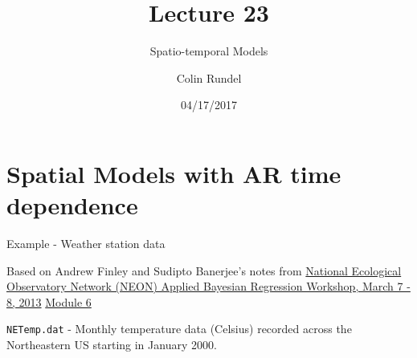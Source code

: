 \documentclass[11pt,ignorenonframetext,]{beamer}
\title{Lecture 23}
\subtitle{Spatio-temporal Models}
\author{Colin Rundel}
\date{04/17/2017}
\let\oldShaded\Shaded
\let\endoldShaded\endShaded
\let\oldverbatim\verbatim
\let\endoldverbatim\endverbatim
\newcommand{\scriptoutput}{
  \renewenvironment{Shaded}{\scriptsize\begin{spacing}{0.9}\oldShaded}{\endoldShaded\end{spacing}}
  \renewenvironment{verbatim}{\scriptsize\begin{spacing}{0.9}\oldverbatim}{\endoldverbatim\end{spacing}}
}
\begin{document}
\frame{\titlepage}

\section{Spatial Models with AR time
dependence}\label{spatial-models-with-ar-time-dependence}

\begin{frame}[fragile]{Example - Weather station data}

\footnotesize

Based on Andrew Finley and Sudipto Banerjee's notes from
\href{http://blue.for.msu.edu/NEON/SC/}{National Ecological Observatory
Network (NEON) Applied Bayesian Regression Workshop, March 7 - 8, 2013}
\href{http://blue.for.msu.edu/NEON/SC/exercises/exercise-6/initial-exploration-spDynLM.pdf}{Module
6}

\texttt{NETemp.dat} - Monthly temperature data (Celsius) recorded across
the Northeastern US starting in January 2000.

\scriptoutput


\end{frame}
\end{document}
